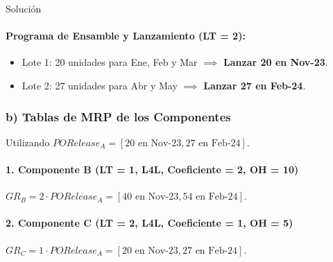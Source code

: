 \documentclass[11pt, a4paper]{article}
\begin{document}
\begin{ejercicio}{Solución}
  \paragraph{Programa de Ensamble y Lanzamiento (LT = 2):}
  \begin{itemize}
    \item Lote 1: 20 unidades para Ene, Feb y Mar $\implies$ \textbf{Lanzar 20 en Nov-23}.
    \item Lote 2: 27 unidades para Abr y May $\implies$ \textbf{Lanzar 27 en Feb-24}.
  \end{itemize}

  \subsubsection*{b) Tablas de MRP de los Componentes}
  Utilizando $PORelease_A = [20 \text{ en Nov-23}, 27 \text{ en Feb-24}]$.

  \paragraph{1. Componente B (LT = 1, L4L, Coeficiente = 2, OH = 10)}
  $GR_B = 2 \cdot PORelease_A = [40 \text{ en Nov-23}, 54 \text{ en Feb-24}]$.
  \begin{center}
  \end{center}

  \paragraph{2. Componente C (LT = 2, L4L, Coeficiente = 1, OH = 5)}
  $GR_C = 1 \cdot PORelease_A = [20 \text{ en Nov-23}, 27 \text{ en Feb-24}]$.
  \begin{center}
  \end{center}


\end{ejercicio}
\end{document}
